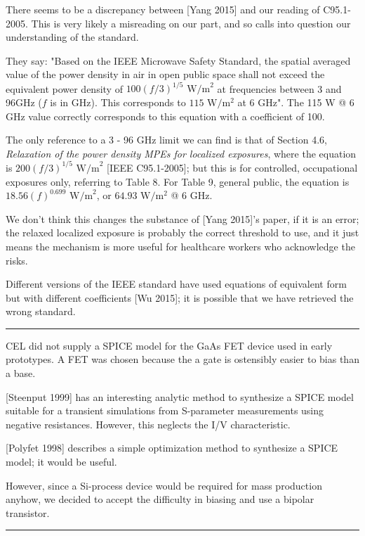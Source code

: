 \documentclass[fleqn,10pt]{article}
\begin{document}
\begin{multicols}{1}
There seems to be a discrepancy between [Yang 2015] and our reading of C95.1-2005. This is very likely a misreading on our part, and so calls into question our understanding of the standard.

They say: "Based on the IEEE Microwave Safety Standard, the spatial averaged value of the power density in air in open public space shall not exceed the equivalent power density of $100(f/3)^{1/5} \text{ W/m}^2$ at frequencies between 3 and 96GHz ($f$ is in GHz). This corresponds to $115 \text{ W}/\text{m}^2$ at 6 GHz". The 115 W @ 6 GHz value correctly corresponds to this equation with a coefficient of 100.

The only reference to a 3 - 96 GHz limit we can find is that of Section 4.6, {\it Relaxation of the power density MPEs for localized exposures}, where the equation is $200 (f/3)^{1/5} \text{ W/m}^2$ [IEEE C95.1-2005]; but this is for controlled, occupational exposures only, referring to Table 8. For Table 9, general public, the equation is $18.56 (f)^{0.699} \text{ W/m}^2$, or $64.93 \text{ W}/\text{m}^2$ @ 6 GHz. 

We don't think this changes the substance of [Yang 2015]'s paper, if it is an error; the relaxed localized exposure is probably the correct threshold to use, and it just means the mechanism is more useful for healthcare workers who acknowledge the risks.

Different versions of the IEEE standard have used equations of equivalent form but with different coefficients [Wu 2015]; it is possible that we have retrieved the wrong standard.

\rule{\linewidth}{0.2pt}



CEL did not supply a SPICE model for the GaAs FET device used in early prototypes. A FET was chosen because the a gate is ostensibly easier to bias than a base.

[Steenput 1999] has an interesting analytic method to synthesize a SPICE model suitable for a transient simulations from S-parameter measurements using negative resistances. However, this neglects the I/V characteristic. 

[Polyfet 1998] describes a simple optimization method to synthesize a SPICE model; it would be useful.

However, since a Si-process device would be required for mass production anyhow, we decided to accept the difficulty in biasing and use a bipolar transistor.

\rule{\linewidth}{0.2pt}


\end{multicols}
\end{document}
